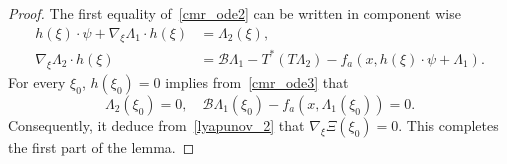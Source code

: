 \documentclass[10pt,a4paper]{amsart}
\begin{document}
\begin{proof}
The first equality of~\eqref{cmr_ode2} can be written in component wise
\begin{equation}\label{cmr_ode3}
\begin{split}
	  h(\xi)\cdot \psi + \nabla_{\xi}\Lambda_1 \cdot h(\xi) &= \Lambda_2(\xi),\\
	\nabla_{\xi}\Lambda_2 \cdot h(\xi) &= \mathcal{B}\Lambda_1 - T^\ast(T\Lambda_2) - f_a(x, h(\xi)\cdot \psi +\Lambda_1).
\end{split}
\end{equation}
For every $\xi_0$, $h(\xi_0) = 0$ implies from~\eqref{cmr_ode3} that 
\[
\Lambda_2(\xi_0) = 0, \quad \mathcal{B}\Lambda_1(\xi_0) - f_a(x, \Lambda_1(\xi_0)) = 0.
\]
Consequently, it deduce from~\eqref{lyapunov_2} that $\nabla_{\xi}\Xi(\xi_0) = 0$. This completes the first part of the lemma.


\end{proof}
\end{document}
